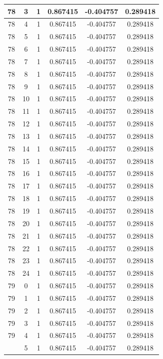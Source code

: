 \documentclass[12pt,a4paper]{article}
\numberwithin{equation}{section}
\numberwithin{figure}{section}
\numberwithin{table}{section}
\begin{document}
\begin{longtable}{|c|c|c|c|c|c|}
78 & 3 & 1 & 0.867415 & -0.404757 & 0.289418 \\ \hline
78 & 4 & 1 & 0.867415 & -0.404757 & 0.289418 \\ \hline
78 & 5 & 1 & 0.867415 & -0.404757 & 0.289418 \\ \hline
78 & 6 & 1 & 0.867415 & -0.404757 & 0.289418 \\ \hline
78 & 7 & 1 & 0.867415 & -0.404757 & 0.289418 \\ \hline
78 & 8 & 1 & 0.867415 & -0.404757 & 0.289418 \\ \hline
78 & 9 & 1 & 0.867415 & -0.404757 & 0.289418 \\ \hline
78 & 10 & 1 & 0.867415 & -0.404757 & 0.289418 \\ \hline
78 & 11 & 1 & 0.867415 & -0.404757 & 0.289418 \\ \hline
78 & 12 & 1 & 0.867415 & -0.404757 & 0.289418 \\ \hline
78 & 13 & 1 & 0.867415 & -0.404757 & 0.289418 \\ \hline
78 & 14 & 1 & 0.867415 & -0.404757 & 0.289418 \\ \hline
78 & 15 & 1 & 0.867415 & -0.404757 & 0.289418 \\ \hline
78 & 16 & 1 & 0.867415 & -0.404757 & 0.289418 \\ \hline
78 & 17 & 1 & 0.867415 & -0.404757 & 0.289418 \\ \hline
78 & 18 & 1 & 0.867415 & -0.404757 & 0.289418 \\ \hline
78 & 19 & 1 & 0.867415 & -0.404757 & 0.289418 \\ \hline
78 & 20 & 1 & 0.867415 & -0.404757 & 0.289418 \\ \hline
78 & 21 & 1 & 0.867415 & -0.404757 & 0.289418 \\ \hline
78 & 22 & 1 & 0.867415 & -0.404757 & 0.289418 \\ \hline
78 & 23 & 1 & 0.867415 & -0.404757 & 0.289418 \\ \hline
78 & 24 & 1 & 0.867415 & -0.404757 & 0.289418 \\ \hline
79 & 0 & 1 & 0.867415 & -0.404757 & 0.289418 \\ \hline
79 & 1 & 1 & 0.867415 & -0.404757 & 0.289418 \\ \hline
79 & 2 & 1 & 0.867415 & -0.404757 & 0.289418 \\ \hline
79 & 3 & 1 & 0.867415 & -0.404757 & 0.289418 \\ \hline
79 & 4 & 1 & 0.867415 & -0.404757 & 0.289418 \\ \hline
\pagebreak
79 & 5 & 1 & 0.867415 & -0.404757 & 0.289418 \\ \hline

\end{longtable}
\end{document}
